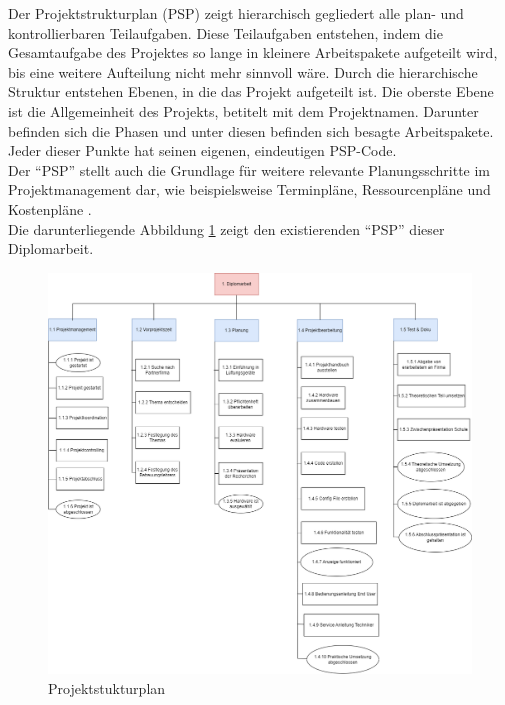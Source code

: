 Der Projektstrukturplan (PSP) zeigt hierarchisch gegliedert alle plan- und kontrollierbaren Teilaufgaben. Diese Teilaufgaben entstehen, indem die Gesamtaufgabe des Projektes so lange in kleinere Arbeitspakete aufgeteilt wird, bis eine weitere Aufteilung nicht mehr sinnvoll wäre. Durch die hierarchische Struktur entstehen Ebenen, in die das Projekt aufgeteilt ist. Die oberste Ebene ist die Allgemeinheit des Projekts, betitelt mit dem Projektnamen. Darunter befinden sich die Phasen und unter diesen befinden sich besagte Arbeitspakete. Jeder dieser Punkte hat seinen eigenen, eindeutigen PSP-Code.
\\Der \enquote{PSP} stellt auch die Grundlage für weitere relevante Planungsschritte im Projektmanagement dar, wie beispielsweise Terminpläne, Ressourcenpläne und Kostenpläne \cite[vgl.][]{Kindl_Niels:2023}. \\
Die darunterliegende Abbildung \ref{fig:projektstrukturplan} zeigt den existierenden \enquote{PSP} dieser Diplomarbeit.

\begin{figure}[H]
	\centering
	\includegraphics[width=0.9\linewidth]{Bilder/projektstrukturplan.png}
	\caption{Projektstukturplan}
	\label{fig:projektstrukturplan}
\end{figure}